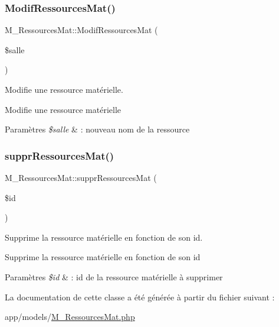 \subsubsection{\texorpdfstring{Modif\+Ressources\+Mat()}{ModifRessourcesMat()}}
{\footnotesize\ttfamily M\+\_\+\+Ressources\+Mat\+::\+Modif\+Ressources\+Mat (\begin{DoxyParamCaption}\item[{}]{\$salle }\end{DoxyParamCaption})}



Modifie une ressource matérielle. 

Modifie une ressource matérielle 
\begin{DoxyParams}{Paramètres}
{\em \$salle} & \+: nouveau nom de la ressource \\
\hline
\end{DoxyParams}
\mbox{\label{class_m___ressources_mat_aab349f1d1de76b59b8ff78a8a7af1001}} 
\subsubsection{\texorpdfstring{suppr\+Ressources\+Mat()}{supprRessourcesMat()}}
{\footnotesize\ttfamily M\+\_\+\+Ressources\+Mat\+::suppr\+Ressources\+Mat (\begin{DoxyParamCaption}\item[{}]{\$id }\end{DoxyParamCaption})}



Supprime la ressource matérielle en fonction de son id. 

Supprime la ressource matérielle en fonction de son id 
\begin{DoxyParams}{Paramètres}
{\em \$id} & \+: id de la ressource matérielle à supprimer \\
\hline
\end{DoxyParams}


La documentation de cette classe a été générée à partir du fichier suivant \+:\begin{DoxyCompactItemize}
\item 
app/models/\hyperlink{_m___ressources_mat_8php}{M\+\_\+\+Ressources\+Mat.\+php}\end{DoxyCompactItemize}
